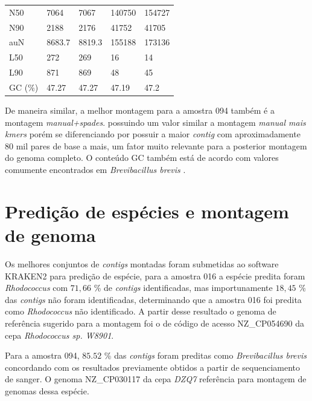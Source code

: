 \begin{table}[htb]
{\begin{tabular}{lllll}
        N50                                          & 7064    & 7067    & 140750  & 154727  \\
        N90                                          & 2188    & 2176    & 41752   & 41705   \\
        auN                                          & 8683.7  & 8819.3  & 155188  & 173136  \\
        L50                                          & 272     & 269     & 16      & 14      \\
        L90                                          & 871     & 869     & 48      & 45      \\
        GC (\%)                                      & 47.27   & 47.27   & 47.19   & 47.2   \\
	\bottomrule
    \end{tabular}
	}{%
	\centering
	  }
\end{table}



De maneira similar, a melhor montagem para a amostra 094 também é a montagem \textit{manual+spades}.
possuindo um valor similar a montagem \textit{manual mais kmers} porém se diferenciando por possuir a maior \textit{contig}
com aproximadamente 80 mil pares de base a mais, um fator muito relevante para a posterior montagem do genoma completo.
O conteúdo GC também está de acordo com valores comumente encontrados em \textit{Brevibacillus brevis} \cite{nakamura1991bacillus}.

\section{Predição de espécies e montagem de genoma}

Os melhores conjuntos de \textit{contigs} montadas foram submetidas ao software KRAKEN2 para predição de espécie,
para a amostra 016 a espécie predita foram \textit{Rhodococcus} com $71,66$ \% de \textit{contigs} identificadas, mas importunamente
$18,45$ \% das \textit{contigs} não foram identificadas, determinando que a amostra 016 foi predita como \textit{Rhodococcus}
não identificado. A partir desse resultado o genoma de referência sugerido para a montagem foi o de código
de acesso NZ\_CP054690 da cepa \textit{Rhodococcus sp. W8901}. 

Para a amostra 094, $85.52$ \% das \textit{contigs} foram preditas como \textit{Brevibacillus brevis}
concordando com os resultados previamente obtidos a partir de sequenciamento de sanger. O genoma NZ\_CP030117
da cepa \textit{DZQ7} referência para montagem de genomas dessa espécie.

